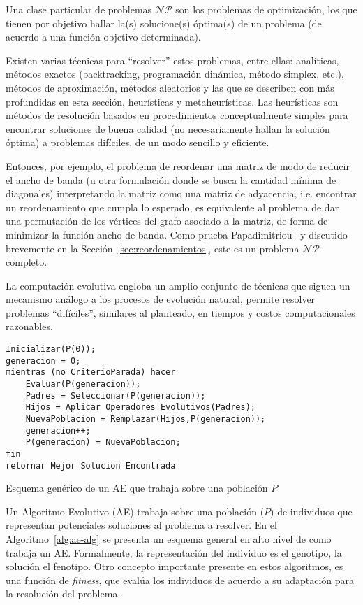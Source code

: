Una clase particular de problemas $\mathcal{NP}$ son los problemas de optimización, los que tienen por objetivo hallar la(s) solucione(s) óptima(s) de un problema (de acuerdo a una función objetivo determinada).  

Existen varias técnicas para ``resolver'' estos problemas, entre ellas: analíticas, métodos exactos (backtracking, programación dinámica, método simplex, etc.), métodos de aproximación, métodos aleatorios y las que se describen con más profundidas en esta sección, heurísticas y metaheurísticas. 
Las heurísticas son métodos de resolución basados en procedimientos conceptualmente simples para encontrar soluciones de buena calidad (no necesariamente hallan la solución óptima) a problemas difíciles, de un modo sencillo y eficiente.

Entonces, por ejemplo, el problema de reordenar una matriz de modo de reducir el ancho de banda (u otra formulación donde se busca la cantidad mínima de diagonales) interpretando la matriz como una matriz de adyacencia, i.e. encontrar un reordenamiento que cumpla lo esperado, es equivalente al problema de dar una permutación de los vértices del grafo asociado a la matriz, de forma de minimizar la función ancho de banda. Como prueba Papadimitriou~\cite{Papadimitriou1976} y discutido brevemente en la Sección~\ref{sec:reordenamientos}, este es un problema $\mathcal{NP}$-completo.

La computación evolutiva engloba un amplio conjunto de técnicas que siguen un mecanismo análogo a los procesos de evolución natural, permite resolver problemas ``difíciles'', similares al planteado, en tiempos y costos computacionales razonables.

\begin{algorithm}[ht]
\begin{verbatim}
Inicializar(P(0));
generacion = 0;
mientras (no CriterioParada) hacer
    Evaluar(P(generacion));
    Padres = Seleccionar(P(generacion));
    Hijos = Aplicar Operadores Evolutivos(Padres);
    NuevaPoblacion = Remplazar(Hijos,P(generacion));
    generacion++;
    P(generacion) = NuevaPoblacion;
fin
retornar Mejor Solucion Encontrada
\end{verbatim}
\caption{Esquema genérico de un AE que trabaja sobre una población $P$}
\label{alg:ae-alg}
\end{algorithm}

Un Algoritmo Evolutivo (AE) trabaja sobre una población ($P$) de individuos que representan potenciales soluciones al problema a resolver. En el Algoritmo~\ref{alg:ae-alg} se presenta un esquema general en alto nivel de como trabaja un AE. Formalmente, la representación del individuo es el genotipo, la solución el fenotipo. Otro concepto importante presente en estos algoritmos, es una función de \textit{fitness}, que evalúa los individuos de acuerdo a su adaptación para la resolución del problema.


